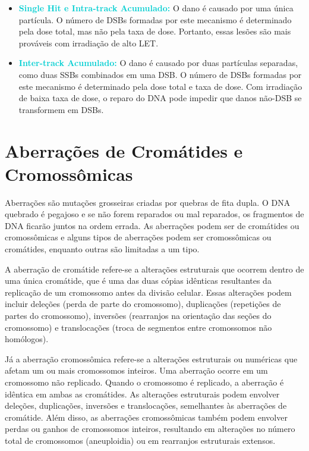 \documentclass[11pt,a4paper]{article}
\begin{document}
	\begin{itemize}[label=\textcolor{CarnationPink}{$\blacksquare$}]
		\item \textcolor{DarkTurquoise}{\textbf{Single Hit e Intra-track Acumulado:}} O dano é causado por uma única partícula. O número de DSBs formadas por este mecanismo é determinado pela dose total, mas não pela taxa de dose. Portanto, essas lesões são mais prováveis com irradiação de alto LET.
		\item \textcolor{DarkTurquoise}{\textbf{Inter-track Acumulado:}} O dano é causado por duas partículas separadas, como duas SSBs combinados em uma DSB. O número de DSBs formadas por este mecanismo é determinado pela dose total e taxa de dose. Com irradiação de baixa taxa de dose, o reparo do DNA pode impedir que danos não-DSB se transformem em DSBs.
	\end{itemize}

\section{Aberrações de Cromátides e Cromossômicas}

	Aberrações são mutações grosseiras criadas por quebras de fita dupla. O DNA quebrado é pegajoso e se não forem reparados ou mal reparados, os fragmentos de DNA ficarão juntos na ordem errada. As aberrações podem ser de cromátides ou cromossômicas e alguns tipos de aberrações podem ser cromossômicas ou cromátides, enquanto outras são limitadas a um tipo.

	A aberração de cromátide refere-se a alterações estruturais que ocorrem dentro de uma única cromátide, que é uma das duas cópias idênticas resultantes da replicação de um cromossomo antes da divisão celular.  Essas alterações podem incluir deleções (perda de parte do cromossomo), duplicações (repetições de partes do cromossomo), inversões (rearranjos na orientação das seções do cromossomo) e translocações (troca de segmentos entre cromossomos não homólogos). 

	Já a aberração cromossômica refere-se a alterações estruturais ou numéricas que afetam um ou mais cromossomos inteiros. Uma aberração ocorre em um cromossomo não replicado. Quando o cromossomo é replicado, a aberração é idêntica em ambas as cromátides. As alterações estruturais podem envolver deleções, duplicações, inversões e translocações, semelhantes às aberrações de cromátide. Além disso, as aberrações cromossômicas também podem envolver perdas ou ganhos de cromossomos inteiros, resultando em alterações no número total de cromossomos (aneuploidia) ou em rearranjos estruturais extensos.
\end{document}
